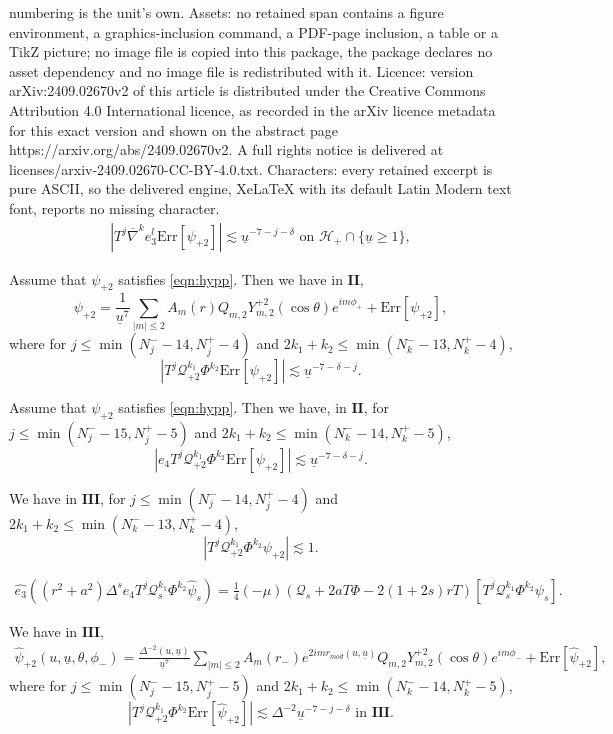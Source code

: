 \documentclass[10pt,a4paper]{amsart}
\newcommand{\Psip}{\psi_{+2}}
\newcommand{\ansatzp}{\frac{1}{\ubar^{7}}\sum_{|m|\leq2}A_m(r)Q_{m,\sfrak}Y_{m,\sfrak}^{+\sfrak}(\cos\theta)e^{im\phi_{+}}}
\newcommand{\carterp}{\mcq_{+2}}
\newcommand{\deux}{\mathbf{II}}
\newcommand{\errp}{\mathrm{Err}[\Psip]}
\newcommand{\ethat}{\widehat{e_3}}
\newcommand{\mch}{\mathcal{H}}
\newcommand{\mcq}{\mathcal{Q}}
\newcommand{\nablabar}{\overline{\nabla}}
\newcommand{\psihatp}{\psihat_{+2}}
\newcommand{\psihat}{\widehat{\psi}}
\newcommand{\psip}{\psi_{+2}}
\newcommand{\sfrak}{2}
\newcommand{\trois}{\mathbf{III}}
\newcommand{\ubar}{{\underline{u}}}
\begin{document}
numbering is the unit's own. Assets: no retained span contains a figure environment, a graphics-inclusion command, a PDF-page inclusion, a table or a TikZ picture; no image file is copied into this package, the package declares no asset dependency and no image file is redistributed with it. Licence: version arXiv:2409.02670v2 of this article is distributed under the Creative Commons Attribution 4.0 International licence, as recorded in the arXiv licence metadata for this exact version and shown on the abstract page https://arxiv.org/abs/2409.02670v2. A full rights notice is delivered at licenses/arxiv-2409.02670-CC-BY-4.0.txt. Characters: every retained excerpt is pure ASCII, so the delivered engine, XeLaTeX with its default Latin Modern text font, reports no missing character.
    \begin{align}   \left|T^j\nablabar^ke_3^l\errp\right|\lesssim\ubar^{-7-j-\delta}\text{   on   }\mch_+\cap\{\ubar\geq 1\}\label{eqn:hypp},
    \end{align}

\begin{prop}\label{prop:ansatzpII}
    Assume that $\Psip$ satisfies \eqref{eqn:hypp}. Then we have in $\deux$, 
    $$\psi_{+2}=\ansatzp+\errp,$$
    where for $j\leq \min(N_j^--14,N_j^+-4)$ and $2k_1+k_2\leq \min(N_k^--13,N_k^+-4)$, 
    $$|T^j\mcq_{+2}^{k_1}\Phi^{k_2}\errp|\lesssim\ubar^{-7-\delta-j}.$$
\end{prop}

\begin{cor}\label{prop:decaynullder}
    Assume that $\Psip$ satisfies \eqref{eqn:hypp}. Then we have, in $\deux$, for $j\leq \min(N_j^--15,N_j^+-5)$ and $2k_1+k_2\leq \min(N_k^--14,N_k^+-5)$,
$$|e_4 T^j\mcq_{+2}^{k_1}\Phi^{k_2}\errp|\lesssim\ubar^{-7-\delta-j}.$$
\end{cor}

\begin{prop}\label{prop:Linf}
We have in $\trois$, for $j\leq \min(N_j^--14,N_j^+-4)$ and $2k_1+k_2\leq \min(N_k^--13,N_k^+-4)$, 
$$|T^j\mcq_{+2}^{k_1}\Phi^{k_2}\psip|\lesssim 1.$$
\end{prop}

\begin{align}\label{eqn:1+1}
    \ethat((r^2+a^2)\Delta^s e_4T^j\mcq_s^{k_1}\Phi^{k_2}\psihat_s)=\frac{1}{4}(-\mu)\left(\mcq_{s}+2aT\Phi-2(1+2s)rT\right)[T^j\mcq_s^{k_1}\Phi^{k_2}\psi_s].
\end{align}

\begin{thm}\label{thm:psip}
    We have in $\trois$,
    \begin{align*}
    \psihatp(u,\ubar,\theta,\phi_{-})=\frac{\Delta^{-2}(u,\ubar)}{\ubar^7}\sum_{|m|\leq2}A_m(r_-)e^{2imr_{mod}(u,\ubar)}Q_{m,\sfrak}Y_{m,\sfrak}^{+\sfrak}(\cos\theta)e^{im\phi_{-}}
    +\mathrm{Err}[\psihatp],
\end{align*}
where for $j\leq \min(N_j^--15,N_j^+-5)$ and $2k_1+k_2\leq \min(N_k^--14,N_k^+-5)$,
$$|T^j\carterp^{k_1}\Phi^{k_2}\mathrm{Err}[\psihatp]|\lesssim\Delta^{-2}\ubar^{-7-j-\delta}\text{   in   }\trois.$$
\end{thm}
\end{document}
